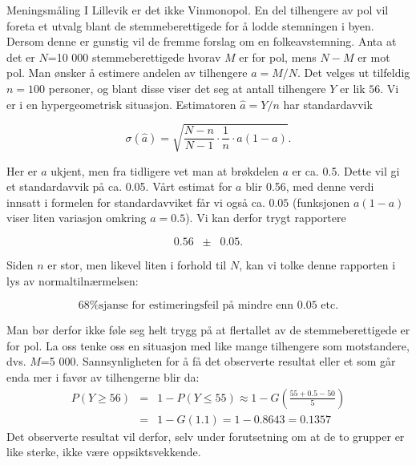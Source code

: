 \begin{eksempel}{Meningsmåling}
I Lillevik er det ikke Vinmonopol. En del tilhengere av pol vil
foreta et utvalg blant de stemmeberettigede for å lodde
stemningen i byen. Dersom denne er gunstig vil de fremme forslag
om en folkeavstemning. Anta at det er $N$=10 000
stemmeberettigede hvorav $M$ er for pol, mens $N-M$ er mot pol.
Man ønsker å estimere andelen av tilhengere $a=M/N$. Det velges
ut tilfeldig $n=100$ personer, og blant disse viser det seg at
antall tilhengere $Y$ er lik $56$. Vi er i en hypergeometrisk
situasjon. Estimatoren $\hat{a} =Y/n$ har standardavvik

\[ \sigma(\hat{a})=\sqrt{\frac{N-n}{N-1} \cdot \frac{1}{n} 
                                            \cdot a(1-a)}. \]

\noindent Her er $a$ ukjent, men fra tidligere vet man at brøkdelen $a$ er
ca. 0.5. Dette vil gi et standardavvik på ca. 0.05. Vårt
estimat for $a$ blir 0.56, med denne verdi innsatt i formelen
for standardavviket får vi også ca. $0.05$ (funksjonen $a (1-a)$
viser liten variasjon omkring $a=0.5$). Vi kan derfor trygt
rapportere

\[     0.56 \;\; \pm \;\; 0.05.  \]

\noindent Siden $n$ er stor, men likevel liten i forhold til $N$, kan vi
tolke denne rapporten i lys av normaltilnærmelsen:

\[     \mbox{68\% sjanse for estimeringsfeil på mindre enn 0.05 etc.} \]

\noindent Man bør derfor ikke føle seg helt trygg på at flertallet
av de stemmeberettigede er for pol. La oss tenke oss en situasjon med
like mange tilhengere som motstandere, dvs. $M$=5 000.
Sannsynligheten for å få det observerte resultat eller et som går
enda mer i favør av tilhengerne blir da:
\begin{eqnarray*}
 P(Y\geq 56)&=&1-P(Y\leq 55) \approx 1-G(\frac{55+0.5-50}{5}) \\
            &=&1-G(1.1)=1-0.8643=0.1357
\end{eqnarray*}
\noindent Det observerte resultat vil derfor, selv under forutsetning om at
de to grupper er like sterke, ikke være oppsiktsvekkende.
\end{eksempel}

